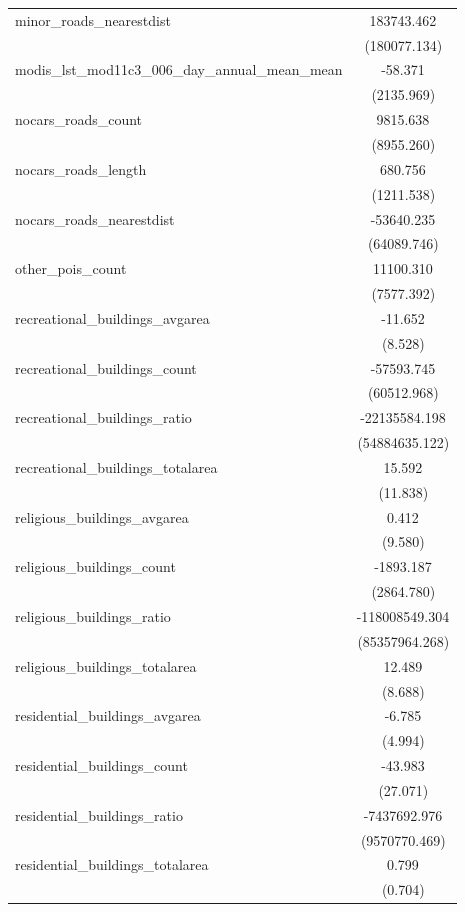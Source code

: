 \begin{table}[!htbp]
\begin{tabular}{@{\extracolsep{5pt}}lc}
 minor_roads_nearestdist & 183743.462$^{}$ \\
  & (180077.134) \\
 modis_lst_mod11c3_006_day_annual_mean_mean & -58.371$^{}$ \\
  & (2135.969) \\
 nocars_roads_count & 9815.638$^{}$ \\
  & (8955.260) \\
 nocars_roads_length & 680.756$^{}$ \\
  & (1211.538) \\
 nocars_roads_nearestdist & -53640.235$^{}$ \\
  & (64089.746) \\
 other_pois_count & 11100.310$^{}$ \\
  & (7577.392) \\
 recreational_buildings_avgarea & -11.652$^{}$ \\
  & (8.528) \\
 recreational_buildings_count & -57593.745$^{}$ \\
  & (60512.968) \\
 recreational_buildings_ratio & -22135584.198$^{}$ \\
  & (54884635.122) \\
 recreational_buildings_totalarea & 15.592$^{}$ \\
  & (11.838) \\
 religious_buildings_avgarea & 0.412$^{}$ \\
  & (9.580) \\
 religious_buildings_count & -1893.187$^{}$ \\
  & (2864.780) \\
 religious_buildings_ratio & -118008549.304$^{}$ \\
  & (85357964.268) \\
 religious_buildings_totalarea & 12.489$^{}$ \\
  & (8.688) \\
 residential_buildings_avgarea & -6.785$^{}$ \\
  & (4.994) \\
 residential_buildings_count & -43.983$^{}$ \\
  & (27.071) \\
 residential_buildings_ratio & -7437692.976$^{}$ \\
  & (9570770.469) \\
 residential_buildings_totalarea & 0.799$^{}$ \\
  & (0.704) \\

\end{tabular}
\end{table}
